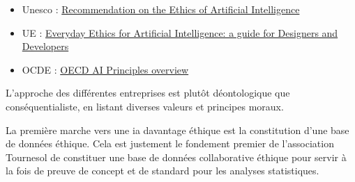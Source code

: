 \begin{itemize}
    \item Unesco : \href{https://unesdoc.unesco.org/ark:/48223/pf0000381137}{Recommendation on the Ethics of Artificial Intelligence
}
    \item UE : \href{https://futurium.ec.europa.eu/en/european-ai-alliance/blog/everyday-ethics-artificial-intelligence-guide-designers-and-developers}{Everyday Ethics for Artificial Intelligence: a guide for Designers and Developers}
    \item OCDE : \href{https://oecd.ai/en/ai-principles}{OECD AI Principles overview}
\end{itemize}

L'approche des différentes entreprises est plutôt déontologique que conséquentialiste, en listant diverses valeurs et principes moraux.


La première marche vers une \gls{ia} davantage éthique est la constitution d'une base de données éthique. Cela est justement le fondement premier de l'association Tournesol de constituer une base de données collaborative éthique pour servir à la fois de preuve de concept et de standard pour les analyses statistiques.